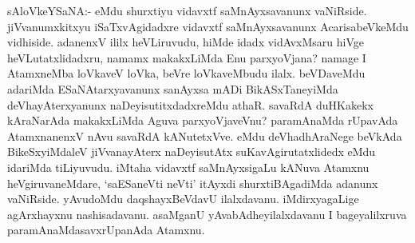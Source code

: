 
\begin{artha}
sAloVkeYSaNA:- eMdu shurxtiyu vidavxtf saMnAyxsavanunx vaNiRside. jiVvanumxkitxyu iSaTxvAgidadxre vidavxtf saMnAyxsavanunx AcarisabeVkeMdu vidhiside. adanenxV ililx heVLiruvudu, hiMde idadx vidAvxMsaru hiVge heVLutatxlidadxru, namamx makakxLiMda Enu parxyoVjana? namage I AtamxneMba loVkaveV loVka, beVre loVkaveMbudu ilalx. beVDaveMdu adariMda ESaNAtarxyavanunx sanAyxsa mADi BikASxTaneyiMda deVhayAterxyanunx naDeyisutitxdadxreMdu athaR. savaRdA duHKakekx kAraNarAda makakxLiMda Aguva parxyoVjaveVnu? paramAnaMda rUpavAda AtamxnanenxV nAvu savaRdA kANutetxVve. eMdu deVhadhAraNege beVkAda BikeSxyiMdaleV jiVvanayAterx naDeyisutAtx suKavAgirutatxlidedx eMdu idariMda tiLiyuvudu. iMtaha vidavxtf saMnAyxsigaLu kANuva Atamxnu heVgiruvaneMdare, `saESaneVti neVti' itAyxdi shurxtiBAgadiMda adanunx vaNiRside. yAvudoMdu daqshayxBeVdavU ilalxdavanu. iMdirxyagaLige agArxhayxnu nashisadavanu. asaMganU yAvabAdheyilalxdavanu I bageyalilxruva paramAnaMdasavxrUpanAda Atamxnu.
\end{artha}



